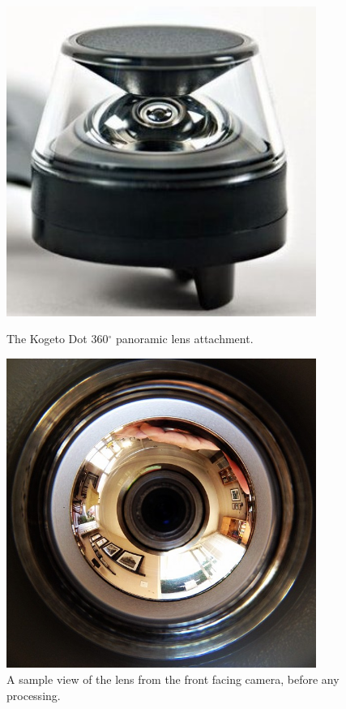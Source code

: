 \documentclass[a4paper,11pt,twoside,openright]{article}
\begin{document}
\begin{figure}[t!]
  \centering
  \begin{minipage}[t!]{0.45\textwidth}
    \centering
    \includegraphics[width=0.9\textwidth]{KogetoDot}
    \caption{The Kogeto Dot 360$^\circ$ panoramic lens attachment.}
  \end{minipage}
  \hfill
  \begin{minipage}[t!]{0.45\textwidth}
    \centering
    \includegraphics[width=0.9\textwidth]{PanoramicView}
    \caption{A sample view of the lens from the front facing camera, before any
      processing.}
  \end{minipage}

\end{figure}
\end{document}
